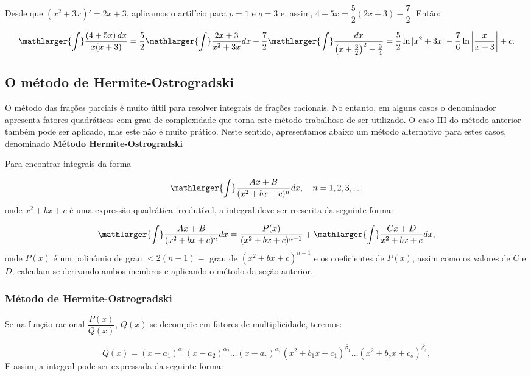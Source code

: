 \cleardoublepage\documentclass[../main.tex]{subfiles}
\begin{document}
\begin{ex}
\begin{compactenum}[a)]
\begin{solution}
Desde que \((x^2+3x)'=2x+ 3\), aplicamos o artifício para \(p=1\) e \(q=3\) e, assim, \(4+5x= \dfrac{5}{2}(2x+3)-\dfrac{7}{2}\). Então:

\[ \mathlarger{\int}\dfrac{(4+5x)\,dx}{x(x+3)}= \dfrac{5}{2} \mathlarger{\int}\dfrac{2x+3}{x^2+3x}dx - \dfrac{7}{2} \mathlarger{\int}\dfrac{dx}{\left(x+\frac{3}{2}\right)^2-\frac{9}{4}}= \dfrac{5}{2}\ln |x^2+3x| -\dfrac{7}{6}\ln \left|\dfrac{x}{x+3} \right|+c. \]
\end{solution}
\end{compactenum}
\end{ex}

\subsection{O método de Hermite-Ostrogradski}\hypertarget{Herm}{}
O método das frações parciais é muito últil para resolver integrais de frações racionais. No entanto, em alguns casos o denominador apresenta fatores quadráticos com grau de complexidade que torna este método trabalhoso de ser utilizado. O caso III do método anterior também pode ser aplicado, mas este não é muito prático. Neste sentido, apresentamos abaixo um método alternativo para estes casos, denominado \textbf{Método Hermite-Ostrogradski}


Para encontrar integrais da forma

\[ \mathlarger{\int}\dfrac{Ax+B}{(x^2+bx+c)^n}dx,\quad n=1,2,3,\ldots \]
onde \(x^2+bx+c\) é uma expressão quadrática irredutível, a integral deve ser reescrita da seguinte forma:

\[ \mathlarger{\int}\dfrac{Ax+B}{(x^2+bx+c)^n}dx = \dfrac{P(x)}{(x^2+bx+c)^{n-1}} + \mathlarger{\int}\dfrac{Cx+D}{x^2+bx+c}dx, \]
onde \(P(x)\) é um polinômio de grau \(<2(n-1)=\) grau de \((x^2+bx+c)^{n-1}\) e os coeficientes de \(P(x)\), assim como os valores de \(C\) e \(D\), calculam-se derivando ambos membros e aplicando o método da seção anterior.

\subsubsection{Método de Hermite-Ostrogradski}
Se na função racional \(\dfrac{P(x)}{Q(x)}\), \(Q(x)\) se decompõe em fatores de multiplicidade, teremos:

\[ Q(x)=(x-a_1)^{\alpha_1}(x-a_2)^{\alpha_2} \ldots (x-a_r)^{\alpha_r}(x^2+b_1x+c_1)^{\beta_1}\ldots (x^2+b_sx+c_s)^{\beta_s}, \]
E assim, a integral pode ser expressada da seguinte forma:
\end{document}
